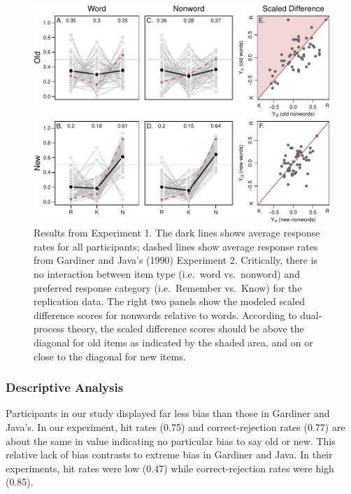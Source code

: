 \documentclass[english,,man]{apa6}
\begin{document}
\begin{figure}
\centering
\includegraphics{p_jou_files/figure-latex/results-1-1.pdf}
\caption{\label{fig:results-1}Results from Experiment 1. The dark lines shows average response rates for all participants; dashed lines show average response rates from Gardiner and Java's (1990) Experiment 2. Critically, there is no interaction between item type (i.e.~word vs.~nonword) and preferred response category (i.e.~Remember vs.~Know) for the replication data. The right two panels show the modeled scaled difference scores for nonwords relative to words. According to dual-process theory, the scaled difference scores should be above the diagonal for old items as indicated by the shaded area, and on or close to the diagonal for new items.}
\end{figure}

\hypertarget{descriptive-analysis}{%
\subsubsection{Descriptive Analysis}\label{descriptive-analysis}}

Participants in our study displayed far less bias than those in Gardiner and Java's. In our experiment, hit rates (0.75) and correct-rejection rates (0.77) are about the same in value indicating no particular bias to say old or new. This relative lack of bias contrasts to extreme bias in Gardiner and Java. In their experiments, hit rates were low (0.47) while correct-rejection rates were high (0.85).
\end{document}
